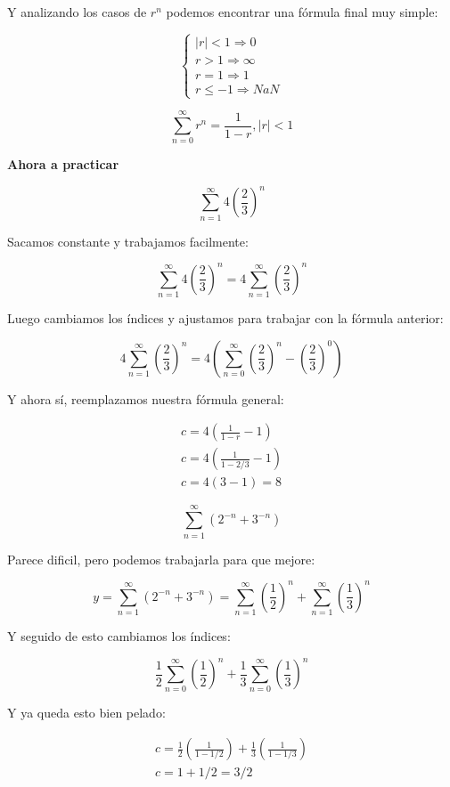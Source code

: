 \documentclass{article}
\newenvironment{formula-box}{
	\begin{tcolorbox}[
		colframe=black, %
		colback=white, %
		arc=1mm, %
		boxrule=1pt, %
		left=2mm, %
		right=2mm, %
		top=2mm, %
		bottom=2mm, %
		]
	}{
	\end{tcolorbox}
}
\newenvironment{cut-me-box}{
	\begin{tcolorbox}[
		colframe=white, %
		colback=white, %
		arc=1mm, %
		left=2mm, %
		right=2mm, %
		top=2mm, %
		bottom=2mm, %
		borderline={0.5mm}{0mm}{black!70!white,dashed},
		enhanced,
		boxrule=0.5mm,
		overlay={
			\node[anchor=north, yshift=-1mm, fill=white] at (frame.north east) {\large \emoji{scissors}}; %
		}
		]
	}{
	\end{tcolorbox}
}
\begin{document}
\begin{multicols}{2}
\begin{formula-box}
			Y analizando los casos de $r^n$ podemos encontrar una fórmula final muy simple:
			
			\[
			\begin{cases}
				|r| < 1 \Rightarrow 0 \\
				r > 1 \Rightarrow \infty \\
				r = 1 \Rightarrow 1 \\
				r \leq -1 \Rightarrow NaN
			\end{cases}
			\]
			
			\[
			\sum_{n=0}^{\infty}r^n = \frac{1}{1-r}, |r| < 1
			\]
			
		\end{formula-box}
		
		\columnbreak
		
		\begin{cut-me-box}
			{\raggedright \large \textbf{Ahora a practicar} \par}
			
			\[
			\sum_{n=1}^{\infty} 4(\frac{2}{3})^n
			\]
			
			Sacamos constante y trabajamos facilmente:
			
			\[
			\sum_{n=1}^{\infty} 4(\frac{2}{3})^n =
			4 \sum_{n=1}^{\infty} (\frac{2}{3})^n
			\]
			
			Luego cambiamos los índices y ajustamos para trabajar con la fórmula anterior:
			
			\[
			4 \sum_{n=1}^{\infty} (\frac{2}{3})^n = 4 (\sum_{n=0}^{\infty} (\frac{2}{3})^n - (\frac{2}{3})^0)
			\]
			
			Y ahora sí, reemplazamos nuestra fórmula general:
			
			\[
			\begin{array}{c}
				c = 4( \frac{1}{1-r} - 1) \\
				c = 4( \frac{1}{1-2/3} - 1) \\
				c = 4( 3 - 1) = 8
			\end{array}
			\]
			
			\[
			\sum_{n=1}^{\infty} ( 2^{-n} + 3^{-n} )
			\]
			
			Parece dificil, pero podemos trabajarla para que mejore:
			
			\[
			y = \sum_{n=1}^{\infty} ( 2^{-n} + 3^{-n} ) = \sum_{n=1}^{\infty} (\frac{1}{2})^n + \sum_{n=1}^{\infty} (\frac{1}{3})^n
			\]
			
			Y seguido de esto cambiamos los índices:
			
			\[
			\frac{1}{2} \sum_{n=0}^{\infty} (\frac{1}{2})^n + \frac{1}{3} \sum_{n=0}^{\infty} (\frac{1}{3})^n
			\]
			
			Y ya queda esto bien pelado:
			
			\[
			\begin{array}{c}
				c = \frac{1}{2}( \frac{1}{1-1/2} ) + \frac{1}{3}( \frac{1}{1 - 1/3} ) \\
				c = 1 + 1/2 = 3/2
			\end{array}
			\]
			
		\end{cut-me-box}
	\end{multicols}
	
\end{document}
